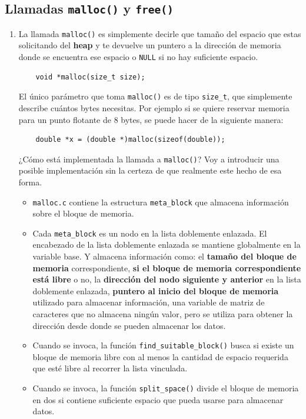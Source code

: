 \documentclass{article}
\begin{document}
\subsection{Llamadas \texttt{malloc()} y \texttt{free()}}
\begin{enumerate}
    \item La llamada \texttt{malloc()} es simplemente decirle que tamaño del espacio que estas solicitando del \textbf{heap} y te devuelve un puntero a la dirección de memoria donde se encuentra ese espacio o \texttt{NULL} si no hay suficiente espacio.
    \begin{verbatim}
    void *malloc(size_t size);
    \end{verbatim}
    El único parámetro que toma \texttt{malloc()} es de tipo \texttt{size\_t}, que simplemente describe cuántos bytes necesitas. Por ejemplo si se quiere reservar memoria para un punto flotante de 8 bytes, se puede hacer de la siguiente manera:
    \begin{verbatim}
    double *x = (double *)malloc(sizeof(double));
    \end{verbatim}
    ¿Cómo está implementada la llamada a \texttt{malloc()}? Voy a introducir una posible implementación sin la certeza de que realmente este hecho de esa forma. 
    \begin{itemize}
        \item \texttt{malloc.c} contiene la estructura \texttt{meta\_block} que almacena información sobre el bloque de memoria.
        \item Cada \texttt{meta\_block} es un nodo en la lista doblemente enlazada. El encabezado de la lista doblemente enlazada se mantiene globalmente en la variable base. Y almacena información como: el \textbf{tamaño del bloque de memoria} correspondiente, \textbf{si el bloque de memoria correspondiente está libre} o no, la \textbf{dirección del nodo siguiente y anterior} en la lista doblemente enlazada, \textbf{puntero al inicio del bloque de memoria} utilizado para almacenar información, una variable de matriz de caracteres que no almacena ningún valor, pero se utiliza para obtener la dirección desde donde se pueden almacenar los datos.
        \item Cuando se invoca, la función \texttt{find\_suitable\_block()} busca si existe un bloque de memoria libre con al menos la cantidad de espacio requerida que esté libre al recorrer la lista vinculada.
        \item Cuando se invoca, la función \texttt{split\_space()} divide el bloque de memoria en dos si contiene suficiente espacio que pueda usarse para almacenar datos.

\end{itemize}
\end{enumerate}
\end{document}
